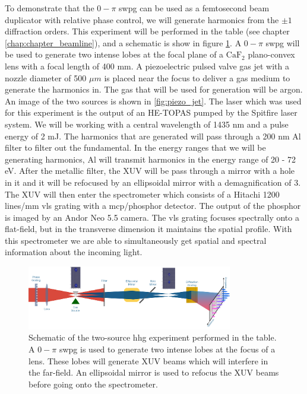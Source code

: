 To demonstrate that the $0-\pi$ \gls{swpg} can be used as a femtosecond beam duplicator with relative phase control, we will generate harmonics from the $\pm1$ diffraction orders.  This experiment will be performed in the \gls{table} (see chapter \ref{chap:chapter_beamline}), and a schematic is show in figure \ref{fig:schematic}.  A $0-\pi$ \gls{swpg} will be used to generate two intense lobes at the focal plane of a $\mathrm{CaF}_2$ plano-convex lens with a focal length of 400 mm.  A piezoelectric pulsed valve gas jet with a nozzle diameter of 500 $\mu m$ is placed near the focus to deliver a gas medium to generate the harmonics in.  The gas that will be used for generation will be argon.  An image of the two sources is shown in \ref{fig:piezo_jet}.  The laser which was used for this experiment is the output of an HE-TOPAS pumped by the Spitfire laser system.  We will be working with a central wavelength of 1435 nm and a pulse energy of 2 mJ.  The harmonics that are generated will pass through a 200 nm Al filter to filter out the fundamental. In the energy ranges that we will be generating harmonics, Al will transmit harmonics in the energy range of 20 - 72 eV.  After the metallic filter, the XUV will be pass through a mirror with a hole in it and it will be refocused by an ellipsoidal mirror with a demagnification of 3.  The XUV will then enter the spectrometer which consists of a Hitachi 1200 lines/mm \gls{vls} grating with a \gls{mcp}/phosphor detector.  The output of the phosphor is imaged by an Andor Neo 5.5 camera.  The \gls{vls} grating focuses spectrally onto a flat-field, but in the transverse dimension it maintains the spatial profile. With this spectrometer we are able to simultaneously get spatial and spectral information about the incoming light.
\begin{figure}
	\centering
	\includegraphics[width=0.8\textwidth]{figures/Two_source/schematic_table.png}
	\caption{Schematic of the two-source \gls{hhg} experiment performed in the \gls{table}. A $0-\pi$ \gls{swpg} is used to generate two intense lobes at the focus of a lens.  These lobes will generate XUV beams which will interfere in the far-field.  An ellipsoidal mirror is used to refocus the XUV beams before going onto the spectrometer.}
	\label{fig:schematic}
\end{figure}
